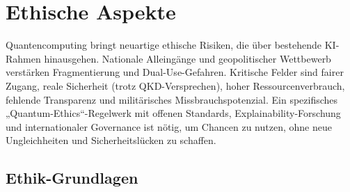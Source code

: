 \chapter{Ethische Aspekte}
\label{ethics} %


Quantencomputing bringt neuartige ethische Risiken, die über bestehende KI-Rahmen hinausgehen. Nationale Alleingänge und geopolitischer Wettbewerb verstärken Fragmentierung und Dual-Use-Gefahren. Kritische Felder sind fairer Zugang, reale Sicherheit (trotz QKD-Versprechen), hoher Ressourcenverbrauch, fehlende Transparenz und militärisches Missbrauchspotenzial. Ein spezifisches „Quantum-Ethics“-Regelwerk mit offenen Standards, Explainability-Forschung und internationaler Governance ist nötig, um Chancen zu nutzen, ohne neue Ungleichheiten und Sicherheitslücken zu schaffen.

\section{Ethik-Grundlagen}

